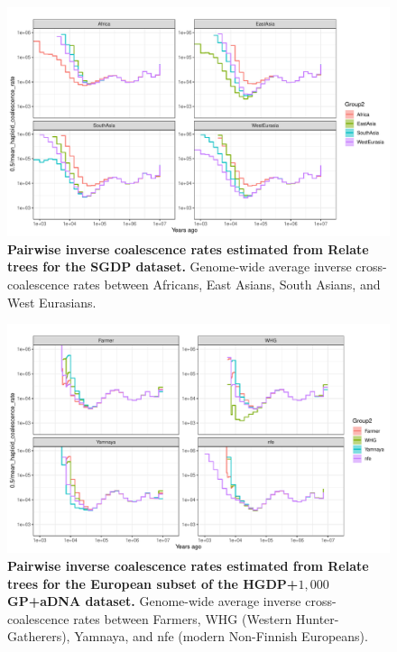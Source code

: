 \begin{figure}
    \centering
    \includegraphics[width=\textwidth]{figures/gb_pairwise_coal/gb_pairwise_coal_SGDP_v5_annot_ne.pairwise.pdf}
    \caption{\textbf{Pairwise inverse coalescence rates estimated from Relate trees for the SGDP dataset.} Genome-wide average inverse cross-coalescence rates between Africans, East Asians, South Asians, and West Eurasians.}
    \label{fig:gb_pairwise_coal_sgdp}
\end{figure}

\begin{figure}
    \centering
    \includegraphics[width=\textwidth]{figures/gb_pairwise_coal/gb_pairwise_coal_3way_europe.pdf}
    \caption{\textbf{Pairwise inverse coalescence rates estimated from Relate trees for the European subset of the HGDP+$1{,}000$GP+aDNA dataset.} Genome-wide average inverse cross-coalescence rates between Farmers, WHG (Western Hunter-Gatherers), Yamnaya, and nfe (modern Non-Finnish Europeans).}
    \label{fig:gb_pairwise_coal_europe_3way}
\end{figure}

